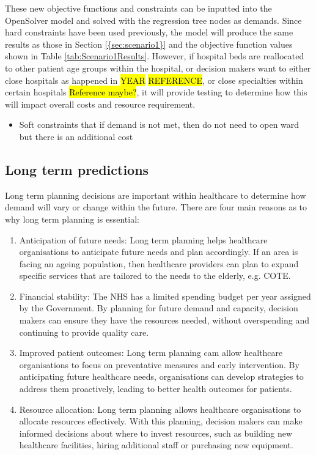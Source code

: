 \documentclass[../thesis.tex]{subfiles}
\begin{document}
These new objective functions and constraints can be inputted into the OpenSolver model and solved with the regression tree nodes as demands. Since hard constraints have been used previously, the model will produce the same results as those in Section \ref{{sec:scenario1}} and the objective function values shown in Table \ref{tab:Scenario1Results}. However, if hospital beds are reallocated to other patient age groups within the hospital, or decision makers want to either close hospitals as happened in \hl{YEAR} \hl{REFERENCE}, or close specialties within certain hospitals \hl{Reference maybe?}, it will provide testing to determine how this will impact overall costs and resource requirement.





\begin{itemize}
    \item Soft constraints that if demand is not met, then do not need to open ward but there is an additional cost
\end{itemize}
\subsection{Long term predictions}
Long term planning decisions are important within healthcare to determine how demand will vary or change within the future. There are four main reasons as to why long term planning is essential:
\begin{enumerate}
    \item Anticipation of future needs: Long term planning helps healthcare organisations to anticipate future needs and plan accordingly. If an area is facing an ageing population, then healthcare providers can plan to expand specific services that are tailored to the needs to the elderly, e.g. COTE.
    \item Financial stability: The NHS has a limited spending budget per year assigned by the Government. By planning for future demand and capacity, decision makers can ensure they have the resources needed, without overspending and continuing to provide quality care.
    \item Improved patient outcomes: Long term planning cam allow healthcare organisations to focus on preventative measures and early intervention. By anticipating future healthcare needs, organisations can develop strategies to address them proactively, leading to better health outcomes for patients.
    \item Resource allocation: Long term planning allows healthcare organisations to allocate resources effectively. With this planning, decision makers can make informed decisions about where to invest resources, such as building new healthcare facilities, hiring additional staff or purchasing new equipment.
\end{enumerate}
\end{document}
